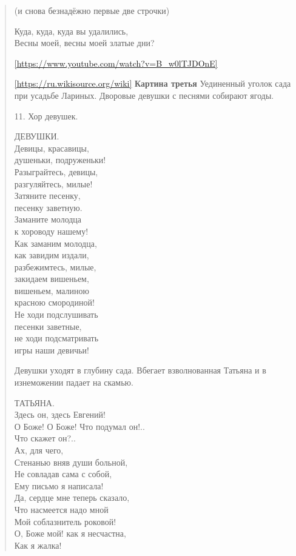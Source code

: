 \begin{verse}
(и снова безнадёжно первые две строчки)

Куда, куда, куда вы удалились,\\
Весны моей, весны моей златые дни?

\ref{https://www.youtube.com/watch?v=B_w0lTJDOnE}


\ref{https://ru.wikisource.org/wiki}
\textbf{Картина третья}
Уединенный уголок сада при усадьбе Лариных. Дворовые девушки с песнями собирают ягоды.

11. Хор девушек.

ДЕВУШКИ.\\
Девицы, красавицы,\\
душеньки, подруженьки!\\
Разыграйтесь, девицы,\\
разгуляйтесь, милые!\\
Затяните песенку,\\
песенку заветную.\\
Заманите молодца\\
к хороводу нашему!\\
Как заманим молодца,\\
как завидим издали,\\
разбежимтесь, милые,\\
закидаем вишеньем,\\
вишеньем, малиною\\
красною смородиной!\\
Не ходи подслушивать\\
песенки заветные,\\
не ходи подсматривать\\
игры наши девичьи!

Девушки уходят в глубину сада. Вбегает взволнованная Татьяна и в изнеможении падает на скамью.

ТАТЬЯНА.\\
Здесь он, здесь Евгений!\\
О Боже! О Боже! Что подумал он!..\\
Что скажет он?..\\
Ах, для чего,\\
Стенанью вняв души больной,\\
Не совладав сама с собой,\\
Ему письмо я написала!\\
Да, сердце мне теперь сказало,\\

Что насмеется надо мной\\
Мой соблазнитель роковой!\\
О, Боже мой! как я несчастна,\\
Как я жалка!


\end{verse}
